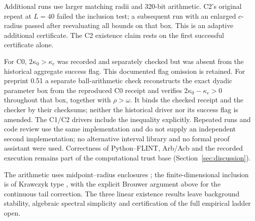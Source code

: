 Additional runs use larger matching radii and 320-bit arithmetic. C2's
original repeat at $L=40$ failed the inclusion test; a subsequent run
with an enlarged $c$-radius passed after reevaluating all bounds on that
box. This is an adaptive additional certificate. The C2 existence claim
rests on the first successful certificate alone.

For C0, $2\kappa_0>\kappa_c$ was recorded and separately checked but
was absent from the historical aggregate success flag. This documented
flag omission is retained. For preprint 0.51 a separate ball-arithmetic
check reconstructs the exact dyadic parameter box from the reproduced
C0 receipt and verifies $2\kappa_0-\kappa_c>0$ throughout that box,
together with $\rho>\omega$. It binds the checked receipt and the checker
by their checksums; neither the historical driver nor its success flag
is amended.
The C1/C2 drivers include the inequality explicitly. Repeated runs and
code review use the same implementation and do not supply an independent
second implementation; no alternative interval library and no formal
proof assistant were used. Correctness of Python--FLINT, Arb/Acb and the
recorded execution remains part of the computational trust base
(Section~\ref{sec:discussion}).

The arithmetic uses midpoint--radius enclosures
\cite{Johansson2017Arb,PythonFlintDocs,FlintSoftware}; the finite-dimensional
inclusion is of Krawczyk type \cite{Krawczyk1969}, with the explicit
Brouwer argument above for the continuous tail correction. The three
linear existence results leave background stability, algebraic spectral
simplicity and certification of the full empirical ladder open.
